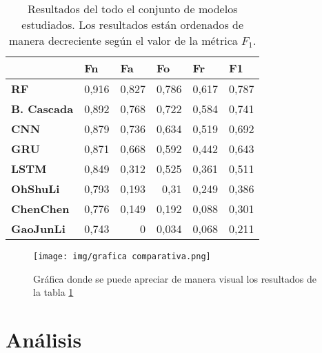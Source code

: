     
    
    \begin{table}[H]
        \caption{Resultados del todo el conjunto de modelos estudiados. Los resultados están ordenados de manera decreciente según el valor de la métrica $F_1$.}
        \begin{center}
        \begin{tabular}{|l|r|r|r|r|r|}
        \hline
        \textbf{} & \multicolumn{1}{l|}{\textbf{Fn}} & \multicolumn{1}{l|}{\textbf{Fa}} & \multicolumn{1}{l|}{\textbf{Fo}} & \multicolumn{1}{l|}{\textbf{Fr}} & \multicolumn{1}{l|}{\textbf{F1}} \\ \hline
        \textbf{RF} & 0,916 & 0,827 & 0,786 & 0,617 & 0,787 \\ \hline
        \textbf{B. Cascada} & 0,892 & 0,768 & 0,722 & 0,584 & 0,741 \\ \hline
        \textbf{CNN} & 0,879 & 0,736 & 0,634 & 0,519 & 0,692 \\ \hline
        \textbf{GRU} & 0,871 & 0,668 & 0,592 & 0,442 & 0,643 \\ \hline
        \textbf{LSTM} & 0,849 & 0,312 & 0,525 & 0,361 & 0,511 \\ \hline
        \textbf{OhShuLi} & 0,793 & 0,193 & 0,31 & 0,249 & 0,386 \\ \hline
        \textbf{ChenChen} & 0,776 & 0,149 & 0,192 & 0,088 & 0,301 \\ \hline
        \textbf{GaoJunLi} & 0,743 & 0 & 0,034 & 0,068 & 0,211 \\ \hline
        \end{tabular}
        \end{center}
        \label{table:Comparativa Global}
    \end{table}
    
    
    \begin{figure}[H]
        \centering
        \texttt{[image: img/grafica comparativa.png]}
        \caption{Gráfica donde se puede apreciar de manera visual los resultados de la tabla \ref{table:Comparativa Global}}
        \label{fig:comparativa}
    \end{figure}

    

\section{Análisis}
    

